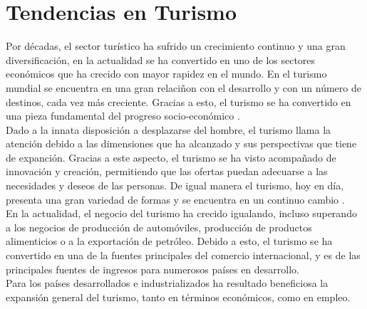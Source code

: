 \section{Tendencias en Turismo}

Por décadas, el sector turístico ha sufrido un crecimiento continuo y una gran diversificación, en la actualidad se ha convertido en uno de los sectores económicos que ha crecido con mayor rapidez en el mundo. En el turismo mundial se encuentra en una gran relaciñon con el desarrollo y con un número de destinos, cada vez más creciente. Gracias a esto, el turismo se ha convertido en una pieza fundamental del progreso socio-económico \cite{turismo}.\\

Dado a la innata disposición a desplazarse del hombre, el turismo llama la atención debido a las dimensiones que ha alcanzado y sus perspectivas que tiene de expanción. Gracias a este aspecto, el turismo se ha visto acompañado de innovación y creación, permitiendo que las ofertas puedan adecuarse a las necesidades y deseos de las personas. De igual manera el turismo, hoy en día, presenta una gran variedad de formas y se encuentra en un continuo cambio \cite{realidadTurismo}. \\

En la actualidad, el negocio del turismo ha crecido igualando, incluso superando a los negocios de producción de automóviles, producción de productos alimenticios o a la exportación  de petróleo. Debido a esto, el turismo se ha convertido en una de la fuentes principales del comercio internacional, y es de las principales fuentes de ingresos para numerosos países en desarrollo.\cite{turismo}\\

Para los países desarrollados e industrializados ha resultado beneficiosa la expansión general del turismo, tanto en términos económicos, como en empleo.